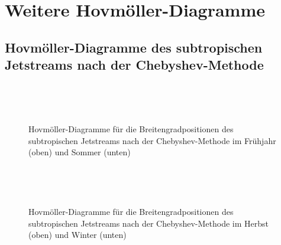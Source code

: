 \chapter{Weitere Hovmöller-Diagramme} \label{ch:app-hovm}

\section{Hovmöller-Diagramme des subtropischen Jetstreams nach der Chebyshev-Methode}

\begin{figure} %
  \centering
  \begin{minipage}{\textwidth}
    \centering
  \end{minipage} \\ 
    \begin{minipage}{\textwidth}
      \centering
  \end{minipage} \\ 
  \caption[Hovmöllerdiagramme der Positionen des Subtropenjets nach Chebyshev im Frühjahr und Sommer]{Hovmöller-Diagramme für die Breitengradpositionen des subtropischen Jetstreams nach der Chebyshev-Methode im Frühjahr (oben) und Sommer (unten)}
  \end{figure}

\begin{figure}
  \centering
  \begin{minipage}{\textwidth}
    \centering
  \end{minipage} \\ 
    \begin{minipage}{\textwidth}
      \centering
  \end{minipage} \\ 
  \caption[Hovmöllerdiagramme der Positionen des Subtropenjets nach Chebyshev im Herbst und Winter]{Hovmöller-Diagramme für die Breitengradpositionen des subtropischen Jetstreams nach der Chebyshev-Methode im Herbst (oben) und Winter (unten)}
\end{figure}

